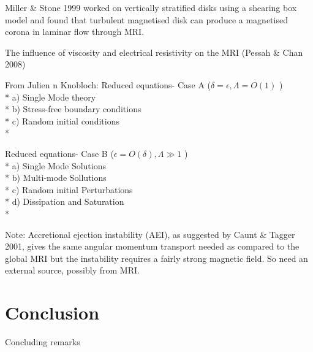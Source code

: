 \documentclass{jfm}
\begin{document}
Miller \& Stone 1999 worked on vertically stratified disks using a shearing box model and found that turbulent magnetised disk can produce a magnetised corona in laminar flow through MRI.

The influence of viscosity and electrical resistivity on the MRI (Pessah \& Chan 2008)
  
From Julien n Knobloch: Reduced equations- Case A ($ \delta = \epsilon, \Lambda = O(1) $ )\\*
 a) Single Mode theory \\*
 b) Stress-free boundary conditions \\*
 c) Random initial conditions \\*
 
 Reduced equations- Case B ($  \epsilon =O( \delta), \Lambda \gg 1 $ ) \\*
 a) Single Mode Solutions \\*
 b) Multi-mode Sollutions \\*
 c) Random initial Perturbations \\*
 d) Dissipation and Saturation \\*
 
Note: Accretional ejection instability (AEI), as suggested by Caunt \& Tagger 2001, gives the same angular momentum transport needed as compared to the global MRI but the instability requires a fairly strong magnetic field. So need an external source, possibly from MRI.



\section{Conclusion}
Concluding remarks





\end{document}
